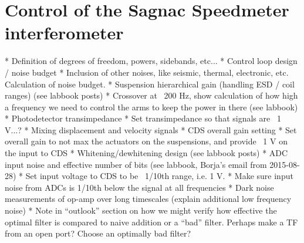 \chapter{Control of the Sagnac Speedmeter interferometer}
\label{c:speedmeter-control}


    * Definition of degrees of freedom, powers, sidebands, etc...
    * Control loop design / noise budget
      * Inclusion of other noises, like seismic, thermal, electronic, etc. Calculation of noise budget.
      * Suspension hierarchical gain (handling ESD / coil ranges) (see labbook posts)
        * Crossover at ~200 Hz, show calculation of how high a frequency we need to control the arms to keep the power in there (see labbook)
      * Photodetector transimpedance
        * Set transimpedance so that signals are ~1 V...?
      * Mixing displacement and velocity signals
      * CDS overall gain setting
        * Set overall gain to not max the actuators on the suspensions, and provide ~1 V on the input to CDS
      * Whitening/dewhitening design (see labbook posts)
        * ADC input noise and effective number of bits (see labbook, Borja's email from 2015-08-28)
        * Set input voltage to CDS to be ~1/10th range, i.e. 1 V.
        * Make sure input noise from ADCs is 1/10th below the signal at all frequencies
    * Dark noise measurements of op-amp over long timescales (explain additional low frequency noise)
    * Note in ``outlook'' section on how we might verify how effective the optimal filter is compared to naive addition or a ``bad'' filter. Perhaps make a TF from an open port? Choose an optimally bad filter?